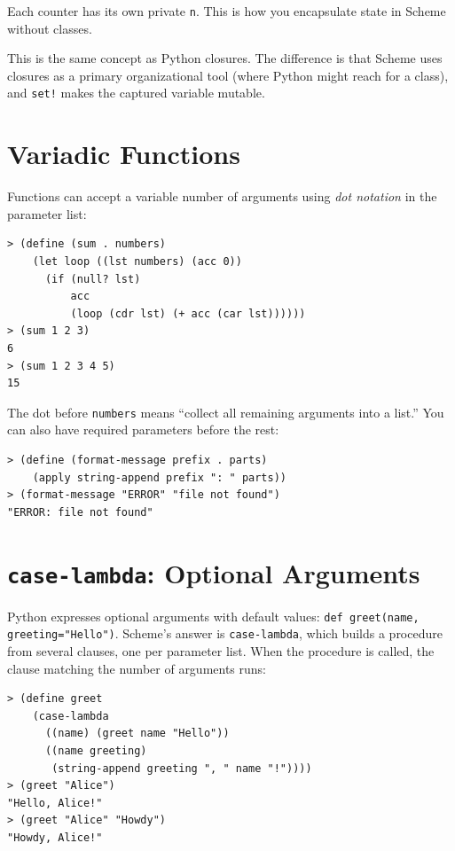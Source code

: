 Each counter has its own private \texttt{n}. This is how you encapsulate state in Scheme without classes.

\begin{note}
This is the same concept as Python closures. The difference is that Scheme uses closures as a primary organizational tool (where Python might reach for a class), and \texttt{set!} makes the captured variable mutable.
\end{note}

\section{Variadic Functions}

Functions can accept a variable number of arguments using \emph{dot notation} in the parameter list:

\begin{lstlisting}[style=repl]
> (define (sum . numbers)
    (let loop ((lst numbers) (acc 0))
      (if (null? lst)
          acc
          (loop (cdr lst) (+ acc (car lst))))))
> (sum 1 2 3)
6
> (sum 1 2 3 4 5)
15
\end{lstlisting}

The dot before \texttt{numbers} means ``collect all remaining arguments into a list.'' You can also have required parameters before the rest:

\begin{lstlisting}[style=repl]
> (define (format-message prefix . parts)
    (apply string-append prefix ": " parts))
> (format-message "ERROR" "file not found")
"ERROR: file not found"
\end{lstlisting}

\section{\texttt{case-lambda}: Optional Arguments}

Python expresses optional arguments with default values: \texttt{def greet(name, greeting="Hello")}. Scheme's answer is \texttt{case-lambda}, which builds a procedure from several clauses, one per parameter list. When the procedure is called, the clause matching the number of arguments runs:

\begin{lstlisting}[style=repl]
> (define greet
    (case-lambda
      ((name) (greet name "Hello"))
      ((name greeting)
       (string-append greeting ", " name "!"))))
> (greet "Alice")
"Hello, Alice!"
> (greet "Alice" "Howdy")
"Howdy, Alice!"
\end{lstlisting}

